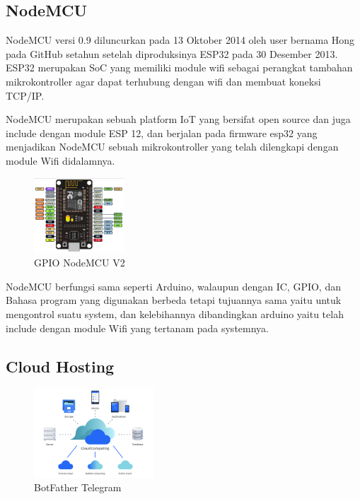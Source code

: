 \documentclass[conference]{IEEEtran}
\begin{document}
    \subsection{NodeMCU}
    NodeMCU versi 0.9 diluncurkan pada 13 Oktober 2014 oleh user bernama Hong pada GitHub setahun setelah diproduksinya ESP32 pada 30 Desember 2013. ESP32 merupakan SoC yang memiliki module wifi sebagai perangkat tambahan mikrokontroller agar dapat terhubung dengan wifi dan membuat koneksi TCP/IP.

    NodeMCU merupakan sebuah platform IoT yang bersifat open source dan juga include dengan module ESP 12, dan berjalan pada firmware esp32 yang menjadikan NodeMCU sebuah mikrokontroller yang telah dilengkapi dengan module Wifi didalamnya.

    \begin{figure}[h]
        \centering
        \includegraphics[width=0.3\textwidth]{Nodem.png}
        \caption{GPIO NodeMCU V2}
    \end{figure}

    NodeMCU berfungsi sama seperti Arduino, walaupun dengan IC, GPIO, dan Bahasa program yang digunakan berbeda tetapi tujuannya sama yaitu untuk mengontrol suatu system, dan kelebihannya dibandingkan arduino yaitu telah include dengan module Wifi yang tertanam pada systemnya.

    \subsection{Cloud Hosting}
    \begin{figure}[h]
        \centering
        \includegraphics[width=0.4\textwidth]{cloud.png}
        \caption{BotFather Telegram}
    \end{figure}
\end{document}
